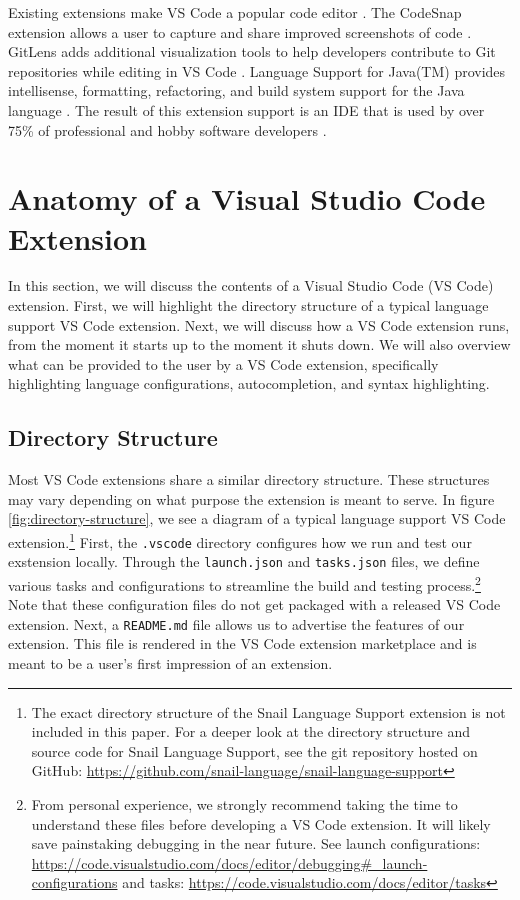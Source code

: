 \documentclass{article}
\begin{document}
Existing extensions make VS Code a popular code editor \cite{StackOverflow_2022}. The CodeSnap extension allows a user to capture and share improved screenshots of code \cite{adpyke_2021}. GitLens adds additional visualization tools to help developers contribute to Git repositories while editing in VS Code \cite{GitKraken_2023}. Language Support for Java(TM) provides intellisense, formatting, refactoring, and build system support for the Java language \cite{RedHat_2023}. The result of this extension support is an IDE that is used by over 75\% of professional and hobby software developers \cite{StackOverflow_2022}. 

\section{Anatomy of a Visual Studio Code Extension}

In this section, we will discuss the contents of a Visual Studio Code (VS Code) extension. First, we will highlight the directory structure of a typical language support VS Code extension. Next, we will discuss how a VS Code extension runs, from the moment it starts up to the moment it shuts down. We will also overview what can be provided to the user by a VS Code extension, specifically highlighting language configurations, autocompletion, and syntax highlighting. 

\subsection{Directory Structure}

Most VS Code extensions share a similar directory structure. These structures may vary depending on what purpose the extension is meant to serve. In figure \ref{fig:directory-structure}, we see a diagram of a typical language support VS Code extension.\footnote{The exact directory structure of the Snail Language Support extension is not included in this paper. For a deeper look at the directory structure and source code for Snail Language Support, see the git repository hosted on GitHub: \url{https://github.com/snail-language/snail-language-support}} First, the \lstinline{.vscode} directory configures how we run and test our exstension locally. Through the \lstinline{launch.json} and \lstinline{tasks.json} files, we define various tasks and configurations to streamline the build and testing process.\footnote{From personal experience, we strongly recommend taking the time to understand these files before developing a VS Code extension. It will likely save painstaking debugging in the near future. See launch configurations: \url{https://code.visualstudio.com/docs/editor/debugging\#_launch-configurations} and tasks: \url{https://code.visualstudio.com/docs/editor/tasks}} Note that these configuration files do not get packaged with a released VS Code extension. Next, a \lstinline{README.md} file allows us to advertise the features of our extension. This file is rendered in the VS Code extension marketplace and is meant to be a user's first impression of an extension.
\end{document}
